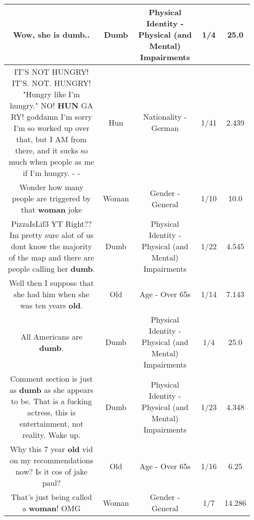 \documentclass[11pt]{article}
\newlength\mylength
\begin{document}
\begin{center}
\begin{longtable}{|C{.65\mylength}|C{.30\mylength}|C{.12\mylength}|C{.12\mylength}|C{.12\mylength}|}
  \small Wow, she is \textbf{dumb}..\normalsize   & Dumb & Physical Identity - Physical (and Mental) Impairments & 1/4 & 25.0 \\  \hline
  \small IT'S NOT HUNGRY! IT'S. NOT. HUNGRY! "Hungry like I'm hungry." NO! \textbf{HUN} GA RY! goddamn I'm sorry I'm so worked up over that, but I AM from there, and it sucks so much when people as me if I'm hungry. - -\normalsize   & Hun & Nationality - German & 1/41 & 2.439 \\  \hline
  \small Wonder how many people are triggered by that \textbf{woman} joke\normalsize   & Woman & Gender - General & 1/10 & 10.0 \\  \hline
  \small PizzaIsLif3 YT Right??Im pretty sure alot of us dont know the majority of the map and there are people calling her \textbf{dumb}.\normalsize   & Dumb & Physical Identity - Physical (and Mental) Impairments & 1/22 & 4.545 \\  \hline
  \small Well then I suppose that she had him when she was ten years \textbf{old}.\normalsize   & Old & Age - Over 65s & 1/14 & 7.143 \\  \hline
  \small All Americans are \textbf{dumb}.\normalsize   & Dumb & Physical Identity - Physical (and Mental) Impairments & 1/4 & 25.0 \\  \hline
  \small Comment section is just as \textbf{dumb} as she appears to be. That is a fucking actress, this is entertainment, not reality. Wake up.\normalsize   & Dumb & Physical Identity - Physical (and Mental) Impairments & 1/23 & 4.348 \\  \hline
  \small Why this 7 year \textbf{old} vid on my recommendations now? Is it cos of jake paul?\normalsize   & Old & Age - Over 65s & 1/16 & 6.25 \\  \hline
  \small That's just being called a \textbf{woman}! OMG\normalsize   & Woman & Gender - General & 1/7 & 14.286 \\  \hline

\end{longtable}
\end{center}
\end{document}
